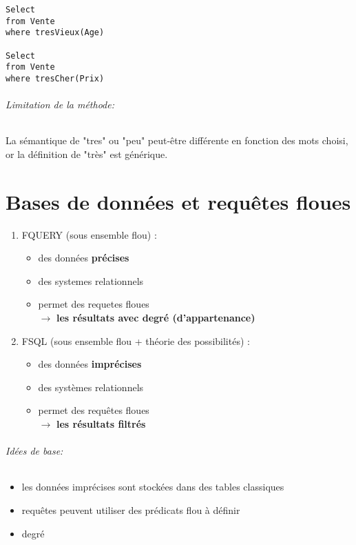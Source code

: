 \documentclass[10pt,a4paper]{report}
\begin{document}
\begin{verbatim}
Select
from Vente
where tresVieux(Age)

Select
from Vente
where tresCher(Prix)

\end{verbatim}

\paragraph{Limitation de la méthode: \\}
La sémantique de "tres" ou "peu" peut-être différente en fonction des mots choisi, or la définition de "très" est générique.

\part{Bases de données et requêtes floues}

\begin{enumerate}
\item FQUERY (sous ensemble flou) : \\
	\begin{itemize}
	\item des données \textbf{précises}
	\item des systemes relationnels
	\item permet des requetes floues\\
	$\longrightarrow$ \textbf{les résultats avec degré (d'appartenance)}
\end{itemize}

\item FSQL (sous ensemble flou + théorie des possibilités) : \\
	\begin{itemize}
	\item des données \textbf{imprécises}
	\item des systèmes relationnels
	\item permet des requêtes floues\\
	$\longrightarrow$ \textbf{les résultats filtrés}
\end{itemize}

\end{enumerate}

\paragraph{Idées de base:\\}
\begin{itemize}
	\item les données imprécises sont stockées dans des tables classiques
	\item requêtes peuvent utiliser des prédicats flou à définir
	\item degré
\end{itemize}
\end{document}
